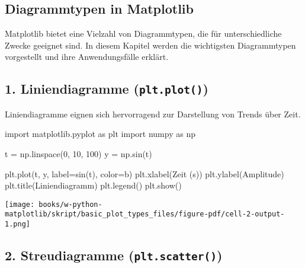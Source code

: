 \documentclass[
  letterpaper,
  DIV=11,
  numbers=noendperiod]{scrreprt}
\newenvironment{Shaded}{\begin{snugshade}}{\end{snugshade}}
\newcommand{\DecValTok}[1]{\textcolor[rgb]{0.68,0.00,0.00}{#1}}
\newcommand{\ImportTok}[1]{\textcolor[rgb]{0.00,0.46,0.62}{#1}}
\newcommand{\NormalTok}[1]{\textcolor[rgb]{0.00,0.23,0.31}{#1}}
\newcommand{\OperatorTok}[1]{\textcolor[rgb]{0.37,0.37,0.37}{#1}}
\newcommand{\StringTok}[1]{\textcolor[rgb]{0.13,0.47,0.30}{#1}}
\begin{document}
\begin{tcolorbox}
\chapter{Diagrammtypen in Matplotlib}\label{diagrammtypen-in-matplotlib}

Matplotlib bietet eine Vielzahl von Diagrammtypen, die für
unterschiedliche Zwecke geeignet sind. In diesem Kapitel werden die
wichtigsten Diagrammtypen vorgestellt und ihre Anwendungsfälle erklärt.

\section{\texorpdfstring{1. Liniendiagramme
(\texttt{plt.plot()})}{1. Liniendiagramme (plt.plot())}}\label{liniendiagramme-plt.plot}

Liniendiagramme eignen sich hervorragend zur Darstellung von Trends über
Zeit.

\begin{Shaded}
\begin{Highlighting}[]
\ImportTok{import}\NormalTok{ matplotlib.pyplot }\ImportTok{as}\NormalTok{ plt}
\ImportTok{import}\NormalTok{ numpy }\ImportTok{as}\NormalTok{ np}

\NormalTok{t }\OperatorTok{=}\NormalTok{ np.linspace(}\DecValTok{0}\NormalTok{, }\DecValTok{10}\NormalTok{, }\DecValTok{100}\NormalTok{)}
\NormalTok{y }\OperatorTok{=}\NormalTok{ np.sin(t)}

\NormalTok{plt.plot(t, y, label}\OperatorTok{=}\StringTok{\textquotesingle{}sin(t)\textquotesingle{}}\NormalTok{, color}\OperatorTok{=}\StringTok{\textquotesingle{}b\textquotesingle{}}\NormalTok{)}
\NormalTok{plt.xlabel(}\StringTok{\textquotesingle{}Zeit (s)\textquotesingle{}}\NormalTok{)}
\NormalTok{plt.ylabel(}\StringTok{\textquotesingle{}Amplitude\textquotesingle{}}\NormalTok{)}
\NormalTok{plt.title(}\StringTok{\textquotesingle{}Liniendiagramm\textquotesingle{}}\NormalTok{)}
\NormalTok{plt.legend()}
\NormalTok{plt.show()}
\end{Highlighting}
\end{Shaded}

\texttt{[image: books/w-python-matplotlib/skript/basic\_plot\_types\_files/figure-pdf/cell-2-output-1.png]}

\section{\texorpdfstring{2. Streudiagramme
(\texttt{plt.scatter()})}{2. Streudiagramme (plt.scatter())}}\label{streudiagramme-plt.scatter}


\end{tcolorbox}
\end{document}
